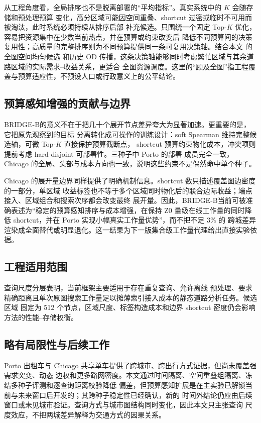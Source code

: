 \documentclass[UTF8,a4paper,10pt,twocolumn]{ctexart}
\newcommand{\zmethod}{Z0}
\newcommand{\bmethod}{BRIDGE-B}
\begin{document}
从工程角度看，全局排序也不是脱离部署的“平均指标”。真实系统中的 $K$ 会随存储和预处理预算
变化，高分区域可能因空间重叠、shortcut 过密或临时不可用而被淘汰，此时系统必须持续从排序后部
补充候选。只围绕一个固定 Top-$K$ 优化，容易把资源集中在少数当前热点，并在预算或约束改变后
降低不同预算间的决策复用性；高质量的完整排序则为不同预算提供同一条可复用决策轴。结合本文
的全图空间均匀候选
和历史 OD 传播，这条决策轴能够同时考虑繁忙区域与其余道路区域的实际需求--收益关系，更适合
全图资源调度。这里的“顾及全图”指工程覆盖与预算适应性，不预设人口或行政意义上的公平结论。

\subsection{预算感知增强的贡献与边界}

\bmethod 的意义不在于把几十个展开节点差异夸大为显著加速。更重要的是，它把原先观察到的目标
分离转化成可操作的训练设计：soft Spearman 维持完整候选轴，可微 Top-$K$ 直接保护预算截断点，
shortcut 预算约束物化成本，冲突项则提前考虑 hard-disjoint 可部署性。三种子中 Porto 的部署
成员完全一致，Chicago 的全局、头部与成本方向也一致，说明这些约束不是偶然命中单个种子。

Chicago 的展开量边界同样提供了明确机制信息。shortcut 数只描述覆盖图边密度的一部分，单区域
收益标签也不等于多个区域同时物化后的联合边际收益；端点接入、区域组合和搜索次序都会改变最终
展开量。因此，\bmethod 当前可被准确表述为“稳定的预算感知排序与成本增强，在保持 \zmethod
量级在线工作量的同时降低 shortcut，并在 Porto 实现小幅真实工作量优势”，而不把不足 3\% 的
跨城差异渲染成全面替代或明显退化。这一结果为下一版集合级工作量代理给出直接实验依据。

\subsection{工程适用范围}

查询尺度分层表明，当前框架主要适用于存在重复查询、允许离线
预处理、要求精确距离且单次原图搜索工作量足以摊薄索引接入成本的静态道路分析任务。候选区域
固定为 512 个节点，区域尺度、标签构造成本和边界 shortcut 密度仍会影响方法的性能--存储权衡。

\subsection{略有局限性与后续工作}

Porto 出租车与 Chicago 共享单车提供了跨城市、跨出行方式证据，但尚未覆盖强需求突变、动态
边权和更多路网密度。本文通过时间隔离、空间重叠组隔离、冻结多种子评测和逐查询距离校验降低
偏差，但预算感知扩展是在主实验已解锁当前与未来窗口后开发的；其跨种子稳定性已经确认，新的
时间外结论仍应由后续窗口或未见城市验证。查询方式与城市图结构同时变化，因此本文只主张查询
尺度效应，不把两城差异解释为交通方式的因果关系。
\end{document}
